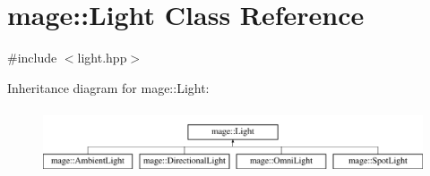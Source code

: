 \hypertarget{classmage_1_1_light}{}\section{mage\+:\+:Light Class Reference}
\label{classmage_1_1_light}


{\ttfamily \#include $<$light.\+hpp$>$}

Inheritance diagram for mage\+:\+:Light\+:\begin{figure}[H]
\begin{center}
\leavevmode
\includegraphics[height=1.944445cm]{classmage_1_1_light}
\end{center}
\end{figure}
